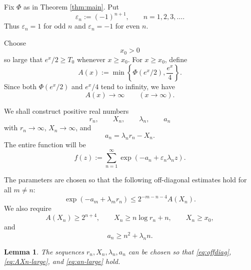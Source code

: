 \documentclass[11pt]{article}
\newtheorem{lemma}{Lemma}
\begin{document}
Fix \(\Phi\) as in Theorem \ref{thm:main}.  Put
\[
\varepsilon_n:=(-1)^{n+1},\qquad n=1,2,3,\ldots .
\]
Thus \(\varepsilon_n=1\) for odd \(n\) and \(\varepsilon_n=-1\) for even \(n\).

Choose
\[
x_0>0
\]
so large that \(e^x/2\ge T_0\) whenever \(x\ge x_0\).  For \(x\ge x_0\), define
\[
A(x):=\min\left\{\Phi(e^x/2),\frac{e^x}{4}\right\}.
\]
Since both \(\Phi(e^x/2)\) and \(e^x/4\) tend to infinity, we have
\[
A(x)\to\infty \qquad (x\to\infty).
\]

We shall construct positive real numbers
\[
r_n,\qquad X_n,\qquad \lambda_n,\qquad a_n
\]
with \(r_n\to\infty\), \(X_n\to\infty\), and
\[
a_n=\lambda_n r_n-X_n.
\]
The entire function will be
\[
 f(z):=\sum_{n=1}^{\infty}
 \exp(-a_n+\varepsilon_n\lambda_n z).
\]

The parameters are chosen so that the following off-diagonal estimates hold
for all \(m\ne n\):
\begin{equation}\label{eq:offdiag}
\exp(-a_m+\lambda_m r_n)
\le
2^{-m-n-4}A(X_n).
\end{equation}
We also require
\begin{equation}\label{eq:AXn-large}
A(X_n)\ge 2^{n+4},
\qquad
X_n\ge n\log r_n+n,
\qquad
X_n\ge x_0,
\end{equation}
and
\begin{equation}\label{eq:an-large}
a_n\ge n^2+\lambda_n n.
\end{equation}

\begin{lemma}\label{lem:choice}
The sequences \(r_n,X_n,\lambda_n,a_n\) can be chosen so that
\eqref{eq:offdiag}, \eqref{eq:AXn-large}, and \eqref{eq:an-large} hold.
\end{lemma}
\end{document}
